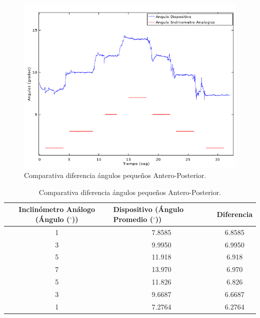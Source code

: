 \documentclass[12pt,a4paper]{article}
\newcommand{\grad}{$^{\circ}$}
\begin{document}
\begin{figure}[H]
	\centering
	\includegraphics[scale=0.9]{images/pruebas/Inclinometro/AnteroPosteriorB}
	\caption{Comparativa diferencia ángulos pequeños Antero-Posterior.}
	\label{fig:inclinometroVsDispositivoAP}
\end{figure}

\begin{table}[H]
	\centering
	\caption{Comparativa diferencia ángulos pequeños Antero-Posterior.}
	\begin{tabular}{|c|c|c|}
		\hline
		\textbf{Inclinómetro Análogo (Ángulo (\grad))} & \multicolumn{1}{l|}{\textbf{Dispositivo (Ángulo Promedio (\grad))}} & Diferencia 				\\ \hline
		1                                      & 7.8585                                                      & 6.8585                     \\ \hline
		3                                      & 9.9950                                                      & 6.9950                    \\ \hline
		5                                      & 11.918                                                      & 6.918                     \\ \hline
		7                                      & 13.970                                                      & 6.970                     \\ \hline
		5                                      & 11.826                                                      & 6.826                      \\ \hline
		3                                      & 9.6687                                                      & 6.6687                     \\ \hline
		1                                      & 7.2764                                                      & 6.2764                     \\ \hline
	\end{tabular}	
	\label{table:inclinometroVsDispositivoAP}
\end{table}
\end{document}
